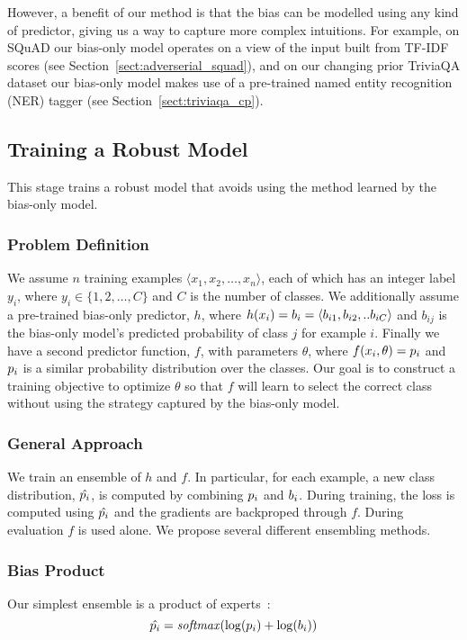 \documentclass[11pt,a4paper]{article}
\begin{document}
However, a benefit of our method is that the bias can be modelled using any kind of predictor, giving us a way to capture more complex intuitions. 
For example, on SQuAD our bias-only model operates on a view of the input built from TF-IDF scores (see Section~\ref{sect:adverserial_squad}), and on our changing prior TriviaQA dataset our bias-only model makes use of a pre-trained named entity recognition (NER) tagger (see Section~\ref{sect:triviaqa_cp}).

\subsection{Training a Robust Model}
This stage trains a robust model that avoids using the method learned by the bias-only model.

\subsubsection{Problem Definition} We assume $n$ training examples $\langle x_1, x_2, \ldots, x_n\rangle$, each of which has an integer label $y_i$, where $y_i \in \{1, 2, \ldots, C\}$ and $C$ is the number of classes. 
We additionally assume a pre-trained bias-only predictor, $h$, where $h(x_i) = b_i = \langle b_{i1}, b_{i2}, .. b_{iC} \rangle$ and $b_{ij}$ is the bias-only model's predicted probability of class $j$ for example $i$.
Finally we have a second predictor function, $f$, with parameters $\theta$, where $f(x_i, \theta) = p_i$ and $p_i$ is a similar probability distribution over the classes.
Our goal is to construct a training objective to optimize $\theta$ so that $f$ will learn to select the correct class without using the strategy captured by the bias-only model. 

\subsubsection{General Approach} 
We train an ensemble of $h$ and $f$. 
In particular, for each example, a new class distribution, $\hat{p_i}$, is computed by combining $p_i$ and $b_i$. During training, the loss is computed using $\hat{p_i}$ and the gradients are backproped through $f$. During evaluation $f$ is used alone. We propose several different ensembling methods.

\subsubsection{Bias Product} 
 Our simplest ensemble is a product of experts~\cite{hinton1999products}:
 $$\hat{p_i} = \mathit{softmax}(\log(p_i) + \log(b_i))$$
 
\end{document}
